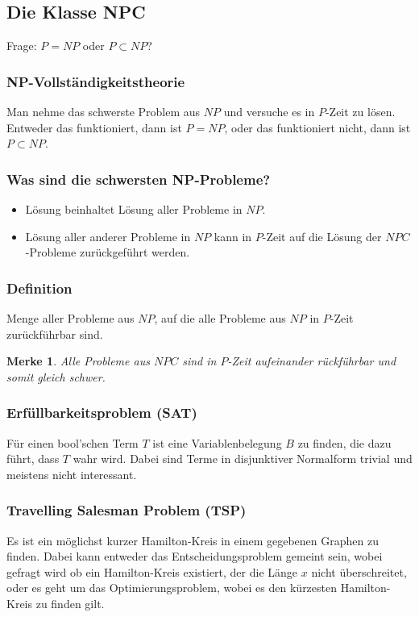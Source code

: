 \documentclass{article}
\begin{document}
\subsection{Die Klasse NPC}
Frage: $P = NP$ oder $P \subset NP$?
\subsubsection{NP-Vollständigkeitstheorie}
Man nehme das schwerste Problem aus $NP$ und versuche es in $P$-Zeit zu lösen.\\
Entweder das funktioniert, dann ist $P = NP$, oder das funktioniert nicht, dann ist $P \subset NP$.
\subsubsection{Was sind die schwersten NP-Probleme?}
\begin{itemize}
    \item Lösung beinhaltet Lösung aller Probleme in $NP$.
    \item Lösung aller anderer Probleme in $NP$ kann in $P$-Zeit auf die Lösung der $NPC$-Probleme zurückgeführt werden.
\end{itemize}
\subsubsection{Definition}
Menge aller Probleme aus $NP$, auf die alle Probleme aus $NP$ in $P$-Zeit zurückführbar sind.
\begin{framed}
    \newtheorem{allenpc}{Merke}
    \begin{allenpc}
        Alle Probleme aus $NPC$ sind in $P$-Zeit aufeinander rückführbar und somit gleich schwer. 
    \end{allenpc}
\end{framed}
\subsubsection{Erfüllbarkeitsproblem (SAT)}
Für einen bool'schen Term $T$ ist eine Variablenbelegung $B$ zu finden, die dazu führt, dass $T$ wahr wird. Dabei sind Terme in disjunktiver Normalform trivial und meistens nicht interessant.

\subsubsection{Travelling Salesman Problem (TSP)}
Es ist ein möglichst kurzer Hamilton-Kreis in einem gegebenen Graphen zu finden. Dabei kann entweder das Entscheidungsproblem gemeint sein, wobei gefragt wird ob ein Hamilton-Kreis existiert, der die Länge $x$ nicht überschreitet, oder es geht um das Optimierungsproblem, wobei es den kürzesten Hamilton-Kreis zu finden gilt.
\end{document}
